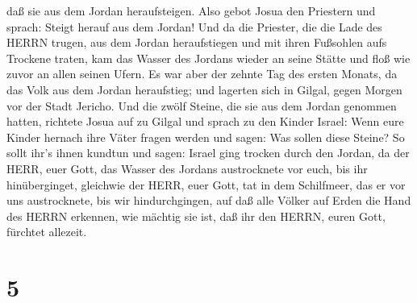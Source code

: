 daß sie aus dem Jordan heraufsteigen.  Also gebot Josua den
Priestern und sprach: Steigt herauf aus dem Jordan!  Und da
die Priester, die die Lade des HERRN trugen, aus dem Jordan
heraufstiegen und mit ihren Fußsohlen aufs Trockene traten, kam das
Wasser des Jordans wieder an seine Stätte und floß wie zuvor an allen
seinen Ufern.  Es war aber der zehnte Tag des ersten
Monats, da das Volk aus dem Jordan heraufstieg; und lagerten sich in
Gilgal, gegen Morgen vor der Stadt Jericho.  Und die zwölf
Steine, die sie aus dem Jordan genommen hatten, richtete Josua auf zu
Gilgal  und sprach zu den Kinder Israel: Wenn eure Kinder
hernach ihre Väter fragen werden und sagen: Was sollen diese Steine?
 So sollt ihr's ihnen kundtun und sagen: Israel ging
trocken durch den Jordan,  da der HERR, euer Gott, das
Wasser des Jordans austrocknete vor euch, bis ihr hinüberginget,
gleichwie der HERR, euer Gott, tat in dem Schilfmeer, das er vor uns
austrocknete, bis wir hindurchgingen,  auf daß alle Völker
auf Erden die Hand des HERRN erkennen, wie mächtig sie ist, daß ihr den
HERRN, euren Gott, fürchtet allezeit.

\hypertarget{section-4}{%
\section{5}\label{section-4}}

